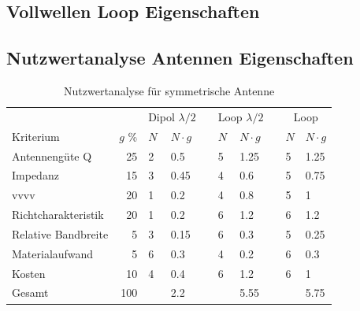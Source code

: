\subsection{Vollwellen Loop Eigenschaften}
\subsection{Nutzwertanalyse Antennen Eigenschaften  }
\begin{table}[htb]
  \centering
  \begin{tabular}{l r l l l l l l l l} \toprule 
  && \multicolumn{2}{c}{Dipol $\lambda/2$}   && \multicolumn{2}{c}{Loop $\lambda/2$}   && \multicolumn{2}{c}{Loop} \\ \cmidrule{3-4} \cmidrule{6-7} \cmidrule{9-10}
  Kriterium                  & $g$ \%  & $N$ & $N\cdot g$               && $N$ & $N\cdot g$                  && $N$ & $N\cdot g$ \\ \midrule
  Antennengüte Q            &  25             & 2   & 0.5               && 5   & 1.25                        && 5   & 1.25 \\
  Impedanz                  &  15             & 3   & 0.45              && 4   & 0.6                         && 5   & 0.75 \\
  vvvv    &  20             & 1   & 0.2               && 4   & 0.8                         && 5   & 1 \\
  Richtcharakteristik       &  20             & 1   & 0.2               && 6   & 1.2                         && 6   & 1.2 \\
  Relative Bandbreite       &   5             & 3   & 0.15              && 6   & 0.3                         && 5   & 0.25 \\
  Materialaufwand           &   5             & 6   & 0.3               && 4   & 0.2                         && 6   & 0.3 \\
  Kosten                    &  10             & 4   & 0.4               && 6   & 1.2                         && 6   & 1 \\
  Gesamt                    & 100             &     & 2.2               &&     & 5.55                        &&     & 5.75 \\ \bottomrule
  \end{tabular}
  \caption{Nutzwertanalyse für symmetrische Antenne}
  \label{nutzwertEvaluation}
\end{table}

